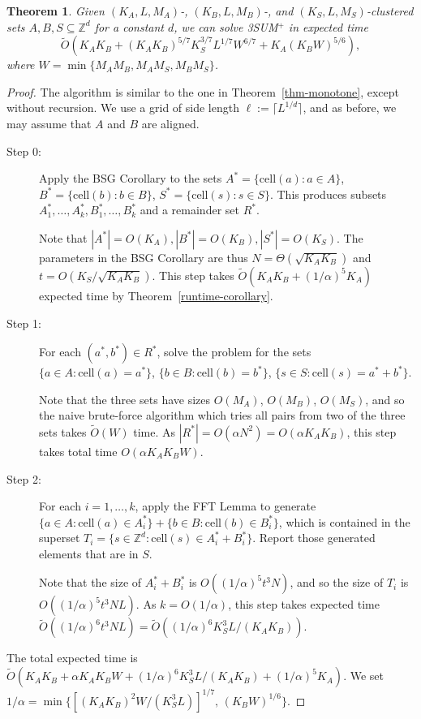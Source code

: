 \documentclass[11pt]{article}
\newtheorem{theorem}{Theorem}[section]
\newcommand{\Z}{\mathbb{Z}}
\newcommand{\OO}{\widetilde{O}}
\newcommand{\CELL}{\textrm{cell}}
\begin{document}
\begin{theorem}\label{thm-cluster}
Given $(K_A,L,M_A)$-, $(K_B,L,M_B)$-, and $(K_S,L,M_S)$-clustered
sets $A,B,S\subseteq\Z^d$ for a constant $d$,
we can solve 3SUM$^+$ in expected time
$$ \OO(K_A K_B + (K_AK_B)^{5/7} K_S^{3/7} L^{1/7}  W^{6/7}
          + K_A (K_B W)^{5/6}),$$
where $W = \min\{M_AM_B, M_AM_S, M_BM_S\}$.
\end{theorem}
\begin{proof}
The algorithm is similar to the one in Theorem~\ref{thm-monotone},
except without recursion.
We use a grid of side length $\ell := \lceil L^{1/d}\rceil$, and
as before,
we may assume that $A$ and $B$ are aligned.
\begin{description}
\item[Step 0:]
Apply the BSG Corollary to the sets $A^*=\{\CELL(a):a\in A\}$,
$B^*=\{\CELL(b):b\in B\}$, $S^*=\{\CELL(s):s\in S\}$.
This produces subsets $A_1^*,\ldots,A_k^*,B_1^*,\ldots,B_k^*$ and a remainder set $R^*$.

Note that $|A^*|=O(K_A),|B^*|=O(K_B),|S^*| =O(K_S)$.
The parameters in the BSG Corollary
are thus $N=\Theta(\sqrt{K_AK_B})$ and $t=O(K_S/\sqrt{K_AK_B})$.
This step takes $\OO(K_AK_B+(1/\alpha)^5 K_A)$ expected time
by Theorem~\ref{runtime-corollary}.
\item[Step 1:]
For each $(a^*,b^*)\in R^*$,
solve the problem for the sets
$\{a\in A: \CELL(a)=a^*\}$, $\{b\in B: \CELL(b)=b^*\}$,
$\{s\in S: \CELL(s)= a^*+b^*\}$.

Note that the three sets have sizes $O(M_A)$, $O(M_B)$,
$O(M_S)$, and so the naive brute-force algorithm which
tries all pairs from two of the three sets takes $\OO(W)$ time.
As $|R^*|=O(\alpha N^2)=O(\alpha K_AK_B)$, this step takes total
time $O(\alpha K_AK_BW)$.

\item[Step 2:]
For each $i=1,\ldots,k$,
apply the FFT Lemma to generate
$\{a\in A: \CELL(a)\in A_i^*\} + \{b\in B: \CELL(b)\in B_i^*\}$,
which is contained in the
superset $T_i = \{s\in \Z^d: \CELL(s)\in A_i^*+B_i^*\}$.
Report those generated elements that are in $S$.

Note that the size of $A_i^*+B_i^*$ is $O((1/\alpha)^5 t^3 N)$,
and so the size of $T_i$ is $O((1/\alpha)^5 t^3 NL)$.
As $k=O(1/\alpha)$, this step takes expected time
$\OO((1/\alpha)^6 t^3 NL)
=\OO((1/\alpha)^6 K_S^3 L/(K_AK_B))$.
\end{description}

The total expected time is
$\OO(K_AK_B + \alpha K_AK_B W + (1/\alpha)^6 K_S^3 L/(K_AK_B)
+ (1/\alpha)^5 K_A)$.
We set $1/\alpha = \min\{[(K_AK_B)^2 W /(K_S^3 L)]^{1/7},\,
(K_B W)^{1/6}\}$.
\end{proof}
\end{document}
